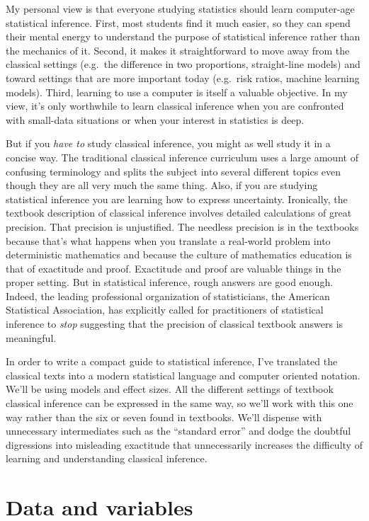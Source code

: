 \documentclass[]{book}
\begin{document}
My personal view is that everyone studying statistics should learn computer-age statistical inference. First, most students find it much easier, so they can spend their mental energy to understand the purpose of statistical inference rather than the mechanics of it. Second, it makes it straightforward to move away from the classical settings (e.g.~the difference in two proportions, straight-line models) and toward settings that are more important today (e.g.~risk ratios, machine learning models). Third, learning to use a computer is itself a valuable objective. In my view, it's only worthwhile to learn classical inference when you are confronted with small-data situations or when your interest in statistics is deep.

But if you \emph{have to} study classical inference, you might as well study it in a concise way. The traditional classical inference curriculum uses a large amount of confusing terminology and splits the subject into several different topics even though they are all very much the same thing. Also, if you are studying statistical inference you are learning how to express uncertainty. Ironically, the textbook description of classical inference involves detailed calculations of great precision. That precision is unjustified. The needless precision is in the textbooks because that's what happens when you translate a real-world problem into deterministic mathematics and because the culture of mathematics education is that of exactitude and proof. Exactitude and proof are valuable things in the proper setting. But in statistical inference, rough answers are good enough. Indeed, the leading professional organization of statisticians, the American Statistical Association, has explicitly called for practitioners of statistical inference to \emph{stop} suggesting that the precision of classical textbook answers is meaningful.

In order to write a compact guide to statistical inference, I've translated the classical texts into a modern statistical language and computer oriented notation. We'll be using models and effect sizes. All the different settings of textbook classical inference can be expressed in the same way, so we'll work with this one way rather than the six or seven found in textbooks. We'll dispense with unnecessary intermediates such as the ``standard error'' and dodge the doubtful digressions into misleading exactitude that unnecessarily increases the difficulty of learning and understanding classical inference.

\hypertarget{data-and-variables}{%
\chapter{Data and variables}\label{data-and-variables}}
\end{document}
